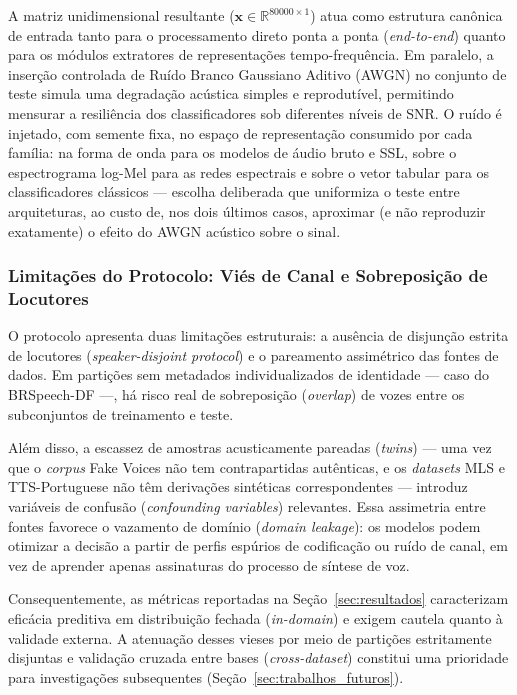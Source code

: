 \documentclass[12pt,a4paper]{article}
\begin{document}
A matriz unidimensional resultante ($\mathbf{x} \in
\mathbb{R}^{\num{80000} \times 1}$) atua como estrutura canônica de entrada
tanto para o processamento direto ponta a ponta (\textit{end-to-end}) quanto
para os módulos extratores de representações tempo-frequência. Em paralelo, a
inserção controlada de Ruído Branco Gaussiano Aditivo (AWGN) no conjunto de
teste simula uma degradação acústica simples e reprodutível, permitindo
mensurar a resiliência dos classificadores sob diferentes níveis de SNR. O
ruído é injetado, com semente fixa, no espaço de representação consumido por
cada família: na forma de onda para os modelos de áudio bruto e SSL, sobre o
espectrograma log-Mel para as redes espectrais e sobre o vetor tabular para os
classificadores clássicos --- escolha deliberada que uniformiza o teste entre
arquiteturas, ao custo de, nos dois últimos casos, aproximar (e não reproduzir
exatamente) o efeito do AWGN acústico sobre o sinal.

\subsubsection{Limitações do Protocolo: Viés de Canal e Sobreposição de Locutores}
\label{sec:vazamento}

O protocolo apresenta duas limitações estruturais: a ausência de disjunção
estrita de locutores (\textit{speaker-disjoint protocol}) e o pareamento
assimétrico das fontes de dados. Em partições sem metadados individualizados de
identidade --- caso do BRSpeech-DF ---, há risco real de sobreposição
(\textit{overlap}) de vozes entre os subconjuntos de treinamento e teste.

Além disso, a escassez de amostras acusticamente pareadas (\textit{twins}) ---
uma vez que o \textit{corpus} Fake Voices não tem contrapartidas autênticas, e
os \textit{datasets} MLS e TTS-Portuguese não têm derivações sintéticas
correspondentes --- introduz variáveis de confusão (\textit{confounding
variables}) relevantes. Essa assimetria entre fontes favorece o vazamento de
domínio (\textit{domain leakage}): os modelos podem otimizar a decisão a partir
de perfis espúrios de codificação ou ruído de canal, em vez de aprender apenas
assinaturas do processo de síntese de voz.

Consequentemente, as métricas reportadas na Seção~\ref{sec:resultados}
caracterizam eficácia preditiva em distribuição fechada (\textit{in-domain}) e
exigem cautela quanto à validade externa. A atenuação desses vieses por meio de
partições estritamente disjuntas e validação cruzada entre bases
(\textit{cross-dataset}) constitui uma prioridade para investigações
subsequentes (Seção~\ref{sec:trabalhos_futuros}).
\end{document}
